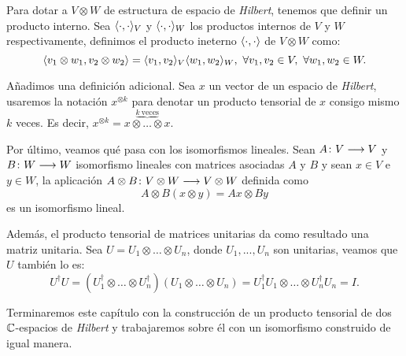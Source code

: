 Para dotar a $V\otimes W$ de estructura de espacio de \textit{Hilbert}, tenemos que definir un producto interno. Sea $\langle\cdot,\cdot\rangle_V$ y $\langle\cdot,\cdot\rangle_W$ los productos internos de $V$ y $W$ respectivamente, definimos el producto ineterno $\langle\cdot,\cdot\rangle$ de $V\otimes W$ como:
\begin{equation}
\dotproduct{v_1\otimes w_1}{v_2\otimes w_2}=\dotproduct{v_1}{v_2}_V\dotproduct{w_1}{w_2}_W,\ \forall v_1,v_2\in V,\ \forall w_1,w_2\in W.
\end{equation}

Añadimos una definición adicional. Sea $x$ un vector de un espacio de \textit{Hilbert}, usaremos la notación $x^{\otimes k}$ para denotar un producto tensorial de $x$ consigo mismo $k$ veces. Es decir,\newline
$x^{\otimes k}=\overset{\underbrace{k\mathrm{\ veces}}}{x\otimes \hdots \otimes x}$.

Por último, veamos qué pasa con los isomorfismos lineales. Sean $A\colon V\longrightarrow V$ y \newline $B\colon W\longrightarrow W$ isomorfismo lineales con matrices asociadas $A$ y $B$ y sean $x\in V$ e $y\in W$, la aplicación $A\otimes B\colon V\otimes W\longrightarrow V\otimes W$ definida como
\begin{equation}
\label{eq:eq36}
A\otimes B(x\otimes y) = Ax\otimes By
\end{equation}
es un isomorfismo lineal.

Además, el producto tensorial de matrices unitarias da como resultado una matriz unitaria. Sea $U=U_1\otimes\hdots\otimes U_n$, donde $U_1,...,U_n$ son unitarias, veamos que $U$ también lo es:
\[U^\dag U = (U_1^\dag\otimes\hdots\otimes U_n^\dag)(U_1\otimes\hdots\otimes U_n)=U_1^\dag U_1\otimes\hdots\otimes U_n^\dag U_n = I.\]

Terminaremos este capítulo con la construcción de un producto tensorial de dos $\mathbb{C}$-espacios de \textit{Hilbert} y trabajaremos sobre él con un isomorfismo construido de igual manera.

